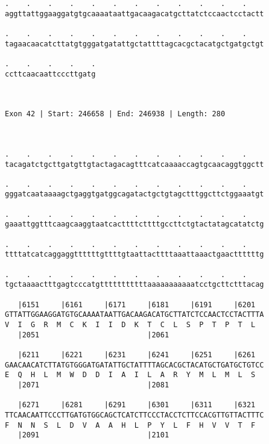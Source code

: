 \documentclass{article}
\begin{document}
\begin{Verbatim}
.    .    .    .    .    .    .    .    .    .    .    .    
aggttattggaaggatgtgcaaaataattgacaagacatgcttatctccaactcctactt
                                                            
.    .    .    .    .    .    .    .    .    .    .    .    
tagaacaacatcttatgtgggatgatattgctattttagcacgctacatgctgatgctgt
                                                            
.    .    .    .    .
ccttcaacaattcccttgatg
                     
                     
 
Exon 42 | Start: 246658 | End: 246938 | Length: 280



.    .    .    .    .    .    .    .    .    .    .    .    
tacagatctgcttgatgttgtactagacagtttcatcaaaaccagtgcaacaggtggctt
                                                            
.    .    .    .    .    .    .    .    .    .    .    .    
gggatcaataaaagctgaggtgatggcagatactgctgtagctttggcttctggaaatgt
                                                            
.    .    .    .    .    .    .    .    .    .    .    .    
gaaattggtttcaagcaaggtaatcacttttcttttgccttctgtactatagcatatctg
                                                            
.    .    .    .    .    .    .    .    .    .    .    .    
ttttatcatcaggaggttttttgttttgtaattacttttaaattaaactgaacttttttg
                                                            
.    .    .    .    .    .    .    .    .    .    .    .    
tgctaaaactttgagtcccatgtttttttttttaaaaaaaaaaatcctgcttctttacag
                                                            
   |6151     |6161     |6171     |6181     |6191     |6201  
GTTATTGGAAGGATGTGCAAAATAATTGACAAGACATGCTTATCTCCAACTCCTACTTTA
V  I  G  R  M  C  K  I  I  D  K  T  C  L  S  P  T  P  T  L  
   |2051                         |2061                      
  
   |6211     |6221     |6231     |6241     |6251     |6261  
GAACAACATCTTATGTGGGATGATATTGCTATTTTAGCACGCTACATGCTGATGCTGTCC
E  Q  H  L  M  W  D  D  I  A  I  L  A  R  Y  M  L  M  L  S  
   |2071                         |2081                      
  
   |6271     |6281     |6291     |6301     |6311     |6321  
TTCAACAATTCCCTTGATGTGGCAGCTCATCTTCCCTACCTCTTCCACGTTGTTACTTTC
F  N  N  S  L  D  V  A  A  H  L  P  Y  L  F  H  V  V  T  F  
   |2091                         |2101                      
  

\end{Verbatim}
\end{document}

